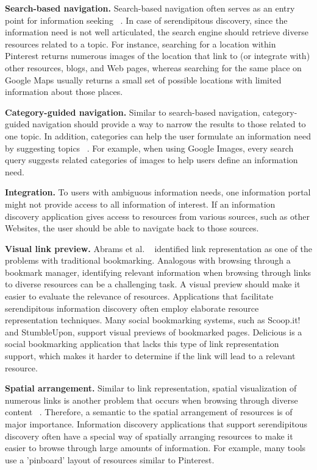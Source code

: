\documentclass{casconpaper}
\begin{document}
{{\textbf{Search-based navigation.} Search-based navigation often serves as an entry point for information seeking ~\cite{levene}. In case of serendipitous discovery, since the information need is not well articulated, the search engine should retrieve diverse resources related to a topic. For instance, searching for a location within Pinterest returns numerous images of the location that link to (or integrate with) other resources, blogs, and Web pages, whereas searching for the same place on Google Maps usually returns a small set of possible locations with limited information about those places.

\textbf{Category-guided navigation.} Similar to search-based navigation, category-guided navigation should provide a way to narrow the results to those related to one topic. In addition, categories can help the user formulate an information need by suggesting topics ~\cite{levene}. For example, when using Google Images, every search query suggests related categories of images to help users define an information need.

\textbf{Integration.} To users with ambiguous information needs, one information portal might not provide access to all information of interest. If an information discovery application gives access to resources from various sources, such as other Websites, the user should be able to navigate back to those sources.

\textbf{Visual link preview.} Abrams et al. ~\cite{abrams} identified link representation as one of the problems with traditional bookmarking. Analogous with browsing through a bookmark manager, identifying relevant information when browsing through links to diverse resources can be a challenging task. A visual preview should make it easier to evaluate the relevance of resources. Applications that facilitate serendipitous information discovery often employ elaborate resource representation techniques. Many social bookmarking systems, such as Scoop.it! and StumbleUpon, support visual previews of bookmarked pages. Delicious is a social bookmarking application that lacks this type of link representation support, which makes it harder to determine if the link will lead to a relevant resource.

\textbf{Spatial arrangement.} Similar to link representation, spatial visualization of numerous links is another problem that occurs when browsing through diverse content ~\cite{abrams}. Therefore, a semantic to the spatial arrangement of resources is of major importance. Information discovery applications that support serendipitous discovery often have a special way of spatially arranging resources to make it easier to browse through large amounts of information. For example, many tools use a 'pinboard' layout of resources similar to Pinterest.



}}
\end{document}
